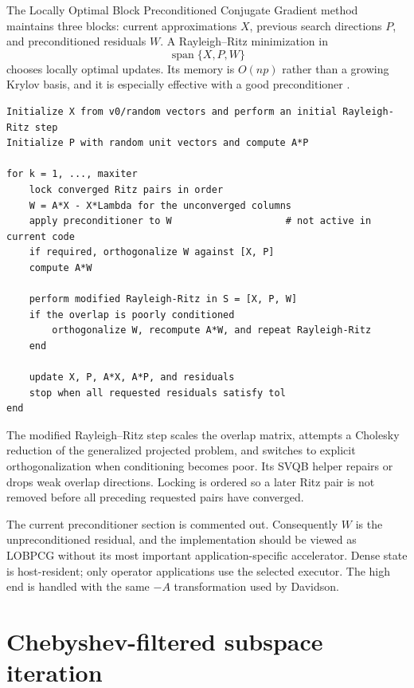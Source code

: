 \documentclass[11pt]{article}
\begin{document}
The Locally Optimal Block Preconditioned Conjugate Gradient method maintains
three blocks: current approximations $X$, previous search directions $P$, and
preconditioned residuals $W$.  A Rayleigh--Ritz minimization in
\begin{equation}
  \operatorname{span}\{X,P,W\}
\end{equation}
chooses locally optimal updates.  Its memory is $O(np)$ rather than a growing
Krylov basis, and it is especially effective with a good preconditioner
\cite{lobpcg,robustlobpcg}.

\begin{lstlisting}
Initialize X from v0/random vectors and perform an initial Rayleigh-Ritz step
Initialize P with random unit vectors and compute A*P

for k = 1, ..., maxiter
    lock converged Ritz pairs in order
    W = A*X - X*Lambda for the unconverged columns
    apply preconditioner to W                    # not active in current code
    if required, orthogonalize W against [X, P]
    compute A*W

    perform modified Rayleigh-Ritz in S = [X, P, W]
    if the overlap is poorly conditioned
        orthogonalize W, recompute A*W, and repeat Rayleigh-Ritz
    end

    update X, P, A*X, A*P, and residuals
    stop when all requested residuals satisfy tol
end
\end{lstlisting}

The modified Rayleigh--Ritz step scales the overlap matrix, attempts a Cholesky
reduction of the generalized projected problem, and switches to explicit
orthogonalization when conditioning becomes poor.  Its SVQB helper repairs or
drops weak overlap directions.  Locking is ordered so a later Ritz pair is not
removed before all preceding requested pairs have converged.

The current preconditioner section is commented out.  Consequently $W$ is the
unpreconditioned residual, and the implementation should be viewed as LOBPCG
without its most important application-specific accelerator.  Dense state is
host-resident; only operator applications use the selected executor.  The high
end is handled with the same $-A$ transformation used by Davidson.

\section{Chebyshev-filtered subspace iteration}
\label{sec:chebyshev}
\end{document}
